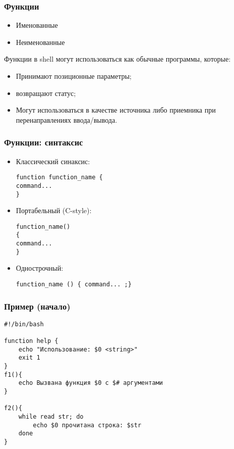 \begin{frame}
	\frametitle{Функции}

	\begin{itemize}
		\item Именованные
		\item Неименованные
	\end{itemize}

	Функции в shell могут использоваться как обычные программы, которые:
	\begin{itemize}
		\item Принимают позиционные параметры;
		\item возвращают статус;
		\item Могут использоваться в качестве источника либо приемника 
			при перенаправлениях ввода/вывода.
	\end{itemize}

\end{frame}


\begin{frame}[fragile]
	\frametitle{Функции: синтаксис}
	\begin{itemize}
		\item Классический синаксис: 
			\begin{lstlisting}
function function_name {
command...
} 
			\end{lstlisting}
		\item Портабельный (C-style):
			\begin{lstlisting}
function_name()
{
command...
} 
			\end{lstlisting}

		\item Однострочный:
			\begin{lstlisting}
function_name () { command... ;}
			\end{lstlisting}
  \end{itemize}
\end{frame}

\begin{frame}[fragile]
	\frametitle{Пример (начало)}
	\small
	\begin{lstlisting}
#!/bin/bash

function help {
	echo "Использование: $0 <string>"
	exit 1
}
f1(){
	echo Вызвана функция $0 с $# аргументами
}

f2(){
	while read str; do
		echo $0 прочитана строка: $str
	done
}
	\end{lstlisting}

\end{frame}



